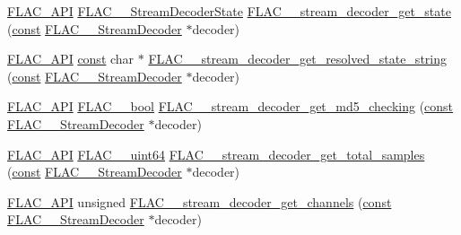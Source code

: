 \begin{DoxyCompactItemize}
\item 
\hyperlink{group__flac__export_ga56ca07df8a23310707732b1c0007d6f5}{F\+L\+A\+C\+\_\+\+A\+PI} \hyperlink{group__flac__stream__decoder_ga3adb6891c5871a87cd5bbae6c770ba2d}{F\+L\+A\+C\+\_\+\+\_\+\+Stream\+Decoder\+State} \hyperlink{group__flac__stream__decoder_ga5899c204ad7183ec04e41855090c0635}{F\+L\+A\+C\+\_\+\+\_\+stream\+\_\+decoder\+\_\+get\+\_\+state} (\hyperlink{getopt1_8c_a2c212835823e3c54a8ab6d95c652660e}{const} \hyperlink{struct_f_l_a_c_____stream_decoder}{F\+L\+A\+C\+\_\+\+\_\+\+Stream\+Decoder} $\ast$decoder)
\item 
\hyperlink{group__flac__export_ga56ca07df8a23310707732b1c0007d6f5}{F\+L\+A\+C\+\_\+\+A\+PI} \hyperlink{getopt1_8c_a2c212835823e3c54a8ab6d95c652660e}{const} char $\ast$ \hyperlink{group__flac__stream__decoder_ga0f086d3e2114f378b06e585ab6f4ff6b}{F\+L\+A\+C\+\_\+\+\_\+stream\+\_\+decoder\+\_\+get\+\_\+resolved\+\_\+state\+\_\+string} (\hyperlink{getopt1_8c_a2c212835823e3c54a8ab6d95c652660e}{const} \hyperlink{struct_f_l_a_c_____stream_decoder}{F\+L\+A\+C\+\_\+\+\_\+\+Stream\+Decoder} $\ast$decoder)
\item 
\hyperlink{group__flac__export_ga56ca07df8a23310707732b1c0007d6f5}{F\+L\+A\+C\+\_\+\+A\+PI} \hyperlink{ordinals_8h_a95103469f1cbd78b8cf250194985b34e}{F\+L\+A\+C\+\_\+\+\_\+bool} \hyperlink{group__flac__stream__decoder_ga3b19d2a761ea61cc57b12e31a5c1adf6}{F\+L\+A\+C\+\_\+\+\_\+stream\+\_\+decoder\+\_\+get\+\_\+md5\+\_\+checking} (\hyperlink{getopt1_8c_a2c212835823e3c54a8ab6d95c652660e}{const} \hyperlink{struct_f_l_a_c_____stream_decoder}{F\+L\+A\+C\+\_\+\+\_\+\+Stream\+Decoder} $\ast$decoder)
\item 
\hyperlink{group__flac__export_ga56ca07df8a23310707732b1c0007d6f5}{F\+L\+A\+C\+\_\+\+A\+PI} \hyperlink{ordinals_8h_aa78c8c70a3eb8a58af7436f278acde8e}{F\+L\+A\+C\+\_\+\+\_\+uint64} \hyperlink{group__flac__stream__decoder_ga68a80ea677bf4abb535abd8f28f2183c}{F\+L\+A\+C\+\_\+\+\_\+stream\+\_\+decoder\+\_\+get\+\_\+total\+\_\+samples} (\hyperlink{getopt1_8c_a2c212835823e3c54a8ab6d95c652660e}{const} \hyperlink{struct_f_l_a_c_____stream_decoder}{F\+L\+A\+C\+\_\+\+\_\+\+Stream\+Decoder} $\ast$decoder)
\item 
\hyperlink{group__flac__export_ga56ca07df8a23310707732b1c0007d6f5}{F\+L\+A\+C\+\_\+\+A\+PI} unsigned \hyperlink{group__flac__stream__decoder_ga42b7d224faeee633e6359ac1f921f39a}{F\+L\+A\+C\+\_\+\+\_\+stream\+\_\+decoder\+\_\+get\+\_\+channels} (\hyperlink{getopt1_8c_a2c212835823e3c54a8ab6d95c652660e}{const} \hyperlink{struct_f_l_a_c_____stream_decoder}{F\+L\+A\+C\+\_\+\+\_\+\+Stream\+Decoder} $\ast$decoder)

\end{DoxyCompactItemize}
